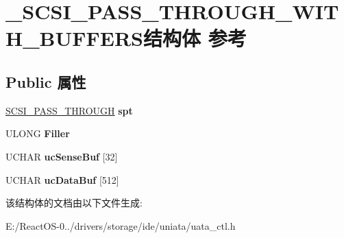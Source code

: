 \hypertarget{struct___s_c_s_i___p_a_s_s___t_h_r_o_u_g_h___w_i_t_h___b_u_f_f_e_r_s}{}\section{\+\_\+\+S\+C\+S\+I\+\_\+\+P\+A\+S\+S\+\_\+\+T\+H\+R\+O\+U\+G\+H\+\_\+\+W\+I\+T\+H\+\_\+\+B\+U\+F\+F\+E\+R\+S结构体 参考}
\label{struct___s_c_s_i___p_a_s_s___t_h_r_o_u_g_h___w_i_t_h___b_u_f_f_e_r_s}
\subsection*{Public 属性}
\begin{DoxyCompactItemize}
\item 
\mbox{\label{struct___s_c_s_i___p_a_s_s___t_h_r_o_u_g_h___w_i_t_h___b_u_f_f_e_r_s_a4665218dc763c16aa855312dbada4e33}} 
\hyperlink{struct___s_c_s_i___p_a_s_s___t_h_r_o_u_g_h}{S\+C\+S\+I\+\_\+\+P\+A\+S\+S\+\_\+\+T\+H\+R\+O\+U\+GH} {\bfseries spt}
\item 
\mbox{\label{struct___s_c_s_i___p_a_s_s___t_h_r_o_u_g_h___w_i_t_h___b_u_f_f_e_r_s_aa5e0603a579f240fe7aa8f53d2f42d4d}} 
U\+L\+O\+NG {\bfseries Filler}
\item 
\mbox{\label{struct___s_c_s_i___p_a_s_s___t_h_r_o_u_g_h___w_i_t_h___b_u_f_f_e_r_s_a5262b6d6477e1ccf823ea8f1ece2dc8b}} 
U\+C\+H\+AR {\bfseries uc\+Sense\+Buf} \mbox{[}32\mbox{]}
\item 
\mbox{\label{struct___s_c_s_i___p_a_s_s___t_h_r_o_u_g_h___w_i_t_h___b_u_f_f_e_r_s_a882559e8cd169fce91693757fe65061b}} 
U\+C\+H\+AR {\bfseries uc\+Data\+Buf} \mbox{[}512\mbox{]}
\end{DoxyCompactItemize}


该结构体的文档由以下文件生成\+:\begin{DoxyCompactItemize}
\item 
E\+:/\+React\+O\+S-\/0../drivers/storage/ide/uniata/uata\+\_\+ctl.\+h\end{DoxyCompactItemize}
